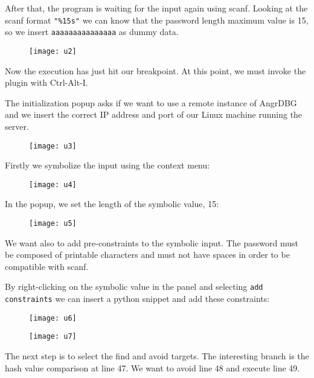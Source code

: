 After that, the program is waiting for the input again using scanf.
Looking at the scanf format \verb|"%15s"| we can know that the password length maximum value is 15, so we insert \verb|aaaaaaaaaaaaaaa| as dummy data.

\begin{figure}[H]
  \centering
  \texttt{[image: u2]}
  \label{fig:u2}
\end{figure}

Now the execution has just hit our breakpoint.
At this point, we must invoke the plugin with Ctrl-Alt-I.

The initialization popup asks if we want to use a remote instance of AngrDBG and we insert the correct IP address and port of our Linux machine running the server.

\begin{figure}[H]
  \centering
  \texttt{[image: u3]}
  \label{fig:u3}
\end{figure}

Firstly we symbolize the input using the context menu:

\begin{figure}[H]
  \centering
  \texttt{[image: u4]}
  \label{fig:u4}
\end{figure}

In the popup, we set the length of the symbolic value, 15:

\begin{figure}[H]
  \centering
  \texttt{[image: u5]}
  \label{fig:u5}
\end{figure} 

We want also to add pre-constraints to the symbolic input. The password must be composed of printable characters and must not have spaces in order to be compatible with scanf.

By right-clicking on the symbolic value in the panel and selecting \verb|add constraints| we can insert a python snippet and add these constraints:

\begin{figure}[H]
  \centering
  \texttt{[image: u6]}
  \label{fig:u6}
\end{figure}

\begin{figure}[H]
  \centering
  \texttt{[image: u7]}
  \label{fig:u7}
\end{figure} 

The next step is to select the find and avoid targets. The interesting branch is the hash value comparison at line 47. We want to avoid line 48 and execute line 49. 

